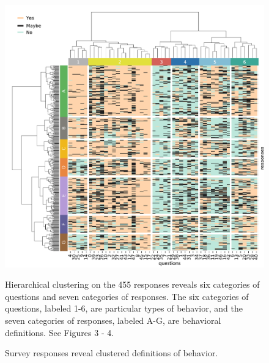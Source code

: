 \documentclass[a4paper, 11pt]{article}
\begin{document}
\begin{figure}
\centerline{\includegraphics[width=\textwidth]{fig2.pdf}}
\caption{Survey responses reveal clustered definitions of behavior.} Hierarchical clustering on the 455 responses reveals six categories of questions and seven categories of responses. The six categories of questions, labeled 1-6, are particular types of behavior, and the seven categories of responses, labeled A-G, are behavioral definitions. See Figures 3 - 4.
\end{figure}




\end{document}
